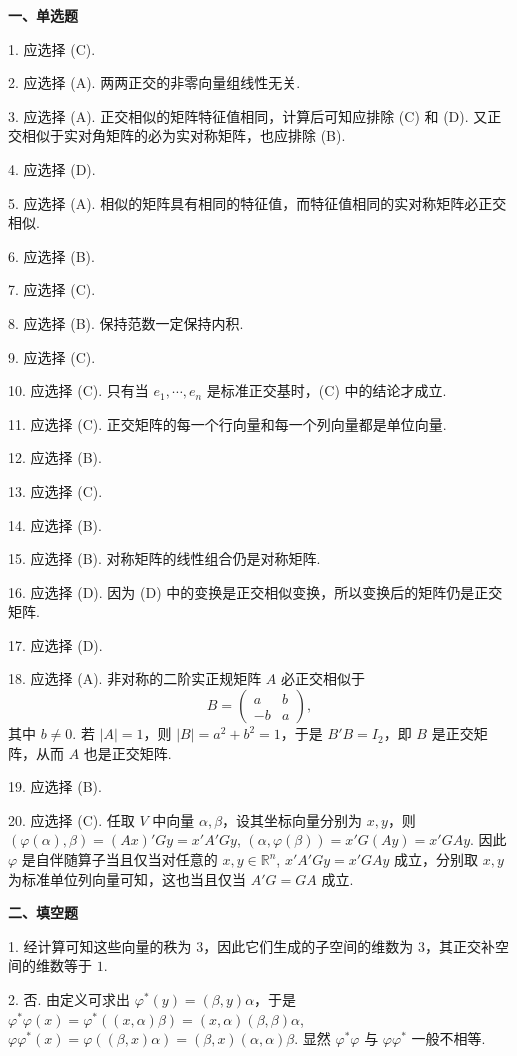 \documentclass[UTF8,12pt,a4paper,fontset=fandol]{ctexart}
\begin{document}
\noindent\textbf{一、单选题}

1. 应选择 (C).

2. 应选择 (A). 两两正交的非零向量组线性无关.

3. 应选择 (A). 正交相似的矩阵特征值相同，计算后可知应排除 (C) 和 (D). 又正交相似于实对角矩阵的必为实对称矩阵，也应排除 (B).

4. 应选择 (D).

5. 应选择 (A). 相似的矩阵具有相同的特征值，而特征值相同的实对称矩阵必正交相似.

6. 应选择 (B).

7. 应选择 (C).

8. 应选择 (B). 保持范数一定保持内积.

9. 应选择 (C).

10. 应选择 (C). 只有当 $e_1,\cdots,e_n$ 是标准正交基时，(C) 中的结论才成立.

11. 应选择 (C). 正交矩阵的每一个行向量和每一个列向量都是单位向量.

12. 应选择 (B).

13. 应选择 (C).

14. 应选择 (B).

15. 应选择 (B). 对称矩阵的线性组合仍是对称矩阵.

16. 应选择 (D). 因为 (D) 中的变换是正交相似变换，所以变换后的矩阵仍是正交矩阵.

17. 应选择 (D).

18. 应选择 (A). 非对称的二阶实正规矩阵 $A$ 必正交相似于
\[
B=\begin{pmatrix}
a&b\\
-b&a
\end{pmatrix},
\]
其中 $b\ne0$. 若 $|A|=1$，则 $|B|=a^2+b^2=1$，于是 $B'B=I_2$，即 $B$ 是正交矩阵，从而 $A$ 也是正交矩阵.

19. 应选择 (B).

20. 应选择 (C). 任取 $V$ 中向量 $\alpha,\beta$，设其坐标向量分别为 $x,y$，则 $(\varphi(\alpha),\beta)=(Ax)'Gy=x'A'Gy$, $(\alpha,\varphi(\beta))=x'G(Ay)=x'GAy$. 因此 $\varphi$ 是自伴随算子当且仅当对任意的 $x,y\in\mathbb{R}^n$, $x'A'Gy=x'GAy$ 成立，分别取 $x,y$ 为标准单位列向量可知，这也当且仅当 $A'G=GA$ 成立.

\noindent\textbf{二、填空题}

1. 经计算可知这些向量的秩为 $3$，因此它们生成的子空间的维数为 $3$，其正交补空间的维数等于 $1$.

2. 否. 由定义可求出 $\varphi^*(y)=(\beta,y)\alpha$，于是 $\varphi^*\varphi(x)=\varphi^*((x,\alpha)\beta)=(x,\alpha)(\beta,\beta)\alpha$, $\varphi\varphi^*(x)=\varphi((\beta,x)\alpha)=(\beta,x)(\alpha,\alpha)\beta$. 显然 $\varphi^*\varphi$ 与 $\varphi\varphi^*$ 一般不相等.
\end{document}
